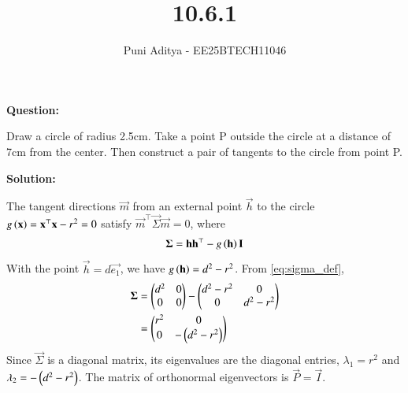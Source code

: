 \documentclass[journal]{IEEEtran}
\begin{document}
\title{10.6.1}
\author{Puni Aditya - EE25BTECH11046}
\maketitle

\textbf{Question:}

Draw a circle of radius 2.5cm. Take a point P outside the circle at a distance of 7cm from the center. Then construct a pair of tangents to the circle from point P.

\textbf{Solution:}

The tangent directions $\vec{m}$ from an external point $\vec{h}$ to the circle $g\left(\mathbf{x}\right)=\mathbf{x}^\top\mathbf{x}-r^2=0$ satisfy $\vec{m}^\top\vec{\Sigma}\vec{m} = 0$, where
\begin{align}
    \mathbf{\Sigma} = \mathbf{h}\mathbf{h}^\top - g\left(\mathbf{h}\right)\mathbf{I} \label{eq:sigma_def}
\end{align}
With the point $\vec{h}=d\vec{e_1}$, we have $g\left(\mathbf{h}\right) = d^2-r^2$. From \eqref{eq:sigma_def},
\begin{align}
    \mathbf{\Sigma} &= \begin{pmatrix}d^2 & 0 \\ 0 & 0\end{pmatrix} - \begin{pmatrix}d^2-r^2 & 0 \\ 0 & d^2-r^2\end{pmatrix} \nonumber \\
    &= \begin{pmatrix}r^2 & 0 \\ 0 & -\left(d^2-r^2\right)\end{pmatrix}
\end{align}
Since $\vec{\Sigma}$ is a diagonal matrix, its eigenvalues are the diagonal entries, $\lambda_1 = r^2$ and $\lambda_2 = -\left(d^2-r^2\right)$. The matrix of orthonormal eigenvectors is $\vec{P}=\vec{I}$.
\end{document}
